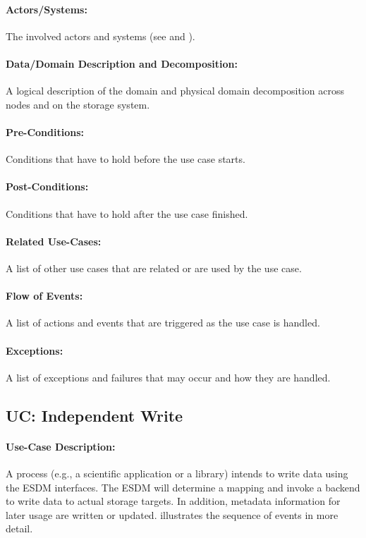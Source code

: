 \paragraph{Actors/Systems:} The involved actors and systems (see and ).

\paragraph{Data/Domain Description and Decomposition:} A logical description of the domain and physical domain decomposition across nodes and on the storage system.

\paragraph{Pre-Conditions:} Conditions that have to hold before the use case starts.

\paragraph{Post-Conditions:} Conditions that have to hold after the use case finished.

\paragraph{Related Use-Cases:} A list of other use cases that are related or are used by the use case.

\paragraph{Flow of Events:} A list of actions and events that are triggered as the use case is handled.

\paragraph{Exceptions:} A list of exceptions and failures that may occur and how they are handled.



\subsection{UC: Independent Write}
\label{uc: independent write}

\paragraph{Use-Case Description:}
A process (e.g., a scientific application or a library) intends to write data using the ESDM interfaces.
The ESDM will determine a mapping and invoke a backend to write data to actual storage targets.
In addition, metadata information for later usage are written or updated.
 illustrates the sequence of events in more detail.


